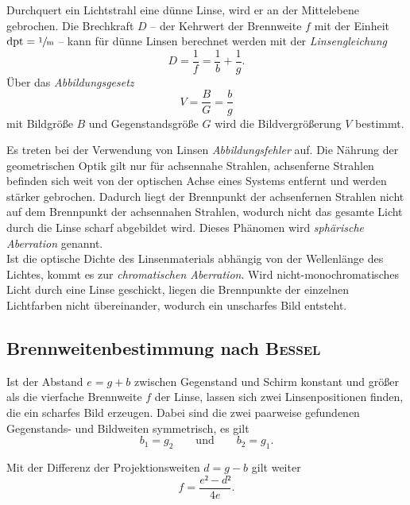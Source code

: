 Durchquert ein Lichtstrahl eine dünne Linse, wird er an der Mittelebene gebrochen.
Die Brechkraft $D$ -- der Kehrwert der Brennweite $f$ mit der Einheit $ \mathrm{dpt}=\sfrac{1}{\si{\meter}}$ -- kann für dünne Linsen berechnet werden mit der \emph{Linsengleichung}
\begin{equation}
	D=\frac{1}{f}=\frac{1}{b}+\frac{1}{g}.
	\label{eq:linsengleichung}
\end{equation}
\newpage
Über das \emph{Abbildungsgesetz} 
\begin{equation}
	V=\frac{B}{G}=\frac{b}{g}
\end{equation}
mit Bildgröße $B$ und Gegenstandsgröße $G$ wird die Bildvergrößerung $V$ bestimmt.

Es treten bei der Verwendung von Linsen \emph{Abbildungsfehler} auf. 
Die Nährung der geometrischen Optik gilt nur für achsennahe Strahlen, achsenferne Strahlen befinden sich weit von der optischen Achse eines Systems entfernt und werden stärker gebrochen. 
Dadurch liegt der Brennpunkt der achsenfernen Strahlen nicht auf dem Brennpunkt der achsennahen Strahlen, wodurch nicht das gesamte Licht durch die Linse scharf abgebildet wird. Dieses Phänomen wird \emph{sphärische Aberration} genannt.\\
Ist die optische Dichte des Linsenmaterials abhängig von der Wellenlänge des Lichtes, kommt es zur \emph{chromatischen Aberration}. 
Wird nicht-monochromatisches Licht durch eine Linse geschickt, liegen die Brennpunkte der einzelnen Lichtfarben nicht übereinander, wodurch ein unscharfes Bild entsteht.

\subsection{Brennweitenbestimmung nach \texorpdfstring{\textsc{Bessel}}{Bessel}}
\label{sec:theorie1}
Ist der Abstand $e=g+b$ zwischen Gegenstand und Schirm konstant und größer als die vierfache Brennweite $f$ der Linse, lassen sich zwei Linsenpositionen finden, die ein scharfes Bild erzeugen. 
Dabei sind die zwei paarweise gefundenen Gegenstands- und Bildweiten symmetrisch, es gilt
\begin{equation}
	b_1=g_2 \qquad \text{und} \qquad b_2=g_1.
\end{equation}

Mit der Differenz der Projektionsweiten $d= g-b$ gilt weiter
\begin{equation}
	f=\frac{e²-d²}{4e}.
\end{equation}

